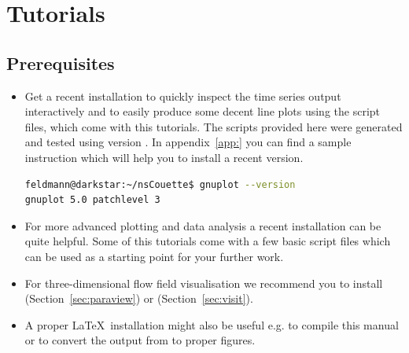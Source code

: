 \documentclass[a4paper, 11pt, DIV=11]{scrartcl}
\begin{document}
\section{Tutorials}
\label{sec:tutorials}

\subsection{Prerequisites}
\begin{itemize}
\item
Get a recent  installation to quickly inspect the time series output
interactively and to easily produce some decent line plots using the 
script files, which come with this tutorials. The scripts provided here were
generated and tested using version . In appendix~\ref{app:}
you can find a sample instruction which will help you to install a recent version.
\begin{lstlisting}[language=bash]
feldmann@darkstar:~/nsCouette$ gnuplot --version
gnuplot 5.0 patchlevel 3
\end{lstlisting}
\item
For more advanced plotting and data analysis a recent  installation can be
quite helpful. Some of this tutorials come with a few basic  script files
which can be used as a starting point for your further work.
\item
For three-dimensional flow field visualisation we recommend you to install 
(Section~\ref{sec:paraview}) or  (Section~\ref{sec:visit}).
\item
A proper \LaTeX~installation might also be useful e.g. to compile this manual or to convert
the  output from  to proper  figures.
\end{itemize}
\end{document}
